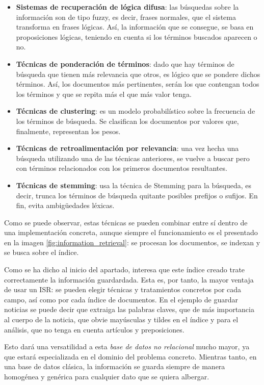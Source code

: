 \begin{itemize}
    \item \textbf{Sistemas de recuperación de lógica difusa}: las búsquedas sobre la información son de tipo fuzzy, es decir, frases normales, que el sistema transforma en frases lógicas. Así, la información que se consegue, se basa en proposiciones lógicas, teniendo en cuenta si los términos buscados aparecen o no.
    \item \textbf{Técnicas de ponderación de términos}: dado que hay términos de búsqueda que tienen más relevancia que otros, es lógico que se pondere dichos términos. Así, los documentos más pertinentes, serán los que contengan todos los términos y que se repita más el que más valor tenga.
    \item \textbf{Técnicas de clustering}: es un modelo probabilístico sobre la frecuencia de los términos de búsqueda. Se clasifican los documentos por valores que, finalmente, representan los pesos.
    \item \textbf{Técnicas de retroalimentación por relevancia}: una vez hecha una búsqueda utilizando una de las técnicas anteriores, se vuelve a buscar pero con términos relacionados con los primeros documentos resultantes.
    \item \textbf{Técnicas de stemming}: usa la técnica de Stemming para la búsqueda, es decir, trunca los términos de búsqueda quitante posibles prefijos o sufijos. En fin, evita ambigüedades léxicas.
\end{itemize}

Como se puede observar, estas técnicas se pueden combinar entre sí dentro de una implementación concreta, aunque siempre el funcionamiento es el presentado en la imagen \ref{fig:information_retrieval}: se procesan los documentos, se indexan y se busca sobre el índice.

Como se ha dicho al inicio del apartado, interesa que este índice creado trate correctamente la información guardardada. Esta es, por tanto, la mayor ventaja de usar un ISR: se pueden elegir técnicas y tratamientos concretos por cada campo, así como por cada índice de documentos. En el ejemplo de guardar noticias se puede decir que extraiga las palabras claves, que de más importancia al cuerpo de la noticia, que obvie mayúsculas y tildes en el índice y para el análisis, que no tenga en cuenta artículos y preposiciones.

Esto dará una versatilidad a esta \textit{base de datos no relacional} mucho mayor, ya que estará especializada en el dominio del problema concreto. Mientras tanto, en una base de datos clásica, la información se guarda siempre de manera homogénea y genérica para cualquier dato que se quiera albergar.

